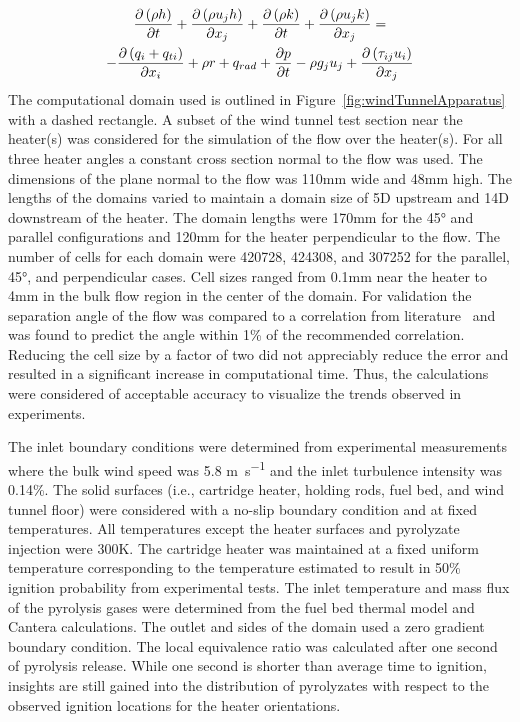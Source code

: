             \begin{multline}
                \pder[\left(\rho h \right)]{t} + \pder[\left( \rho u_j h \right)]{x_j} + \pder[\left(  \rho k \right)]{t} + \pder[\left( \rho u_j k\right)]{x_j} = \\ -
                \pder[\left( q_i + q_{ti} \right)]{x_i} + \rho r + q_{rad} + \pder[p]{t} - \rho g_j u_j + \pder[\left( \tau_{ij} u_i \right)]{x_j}
            \end{multline}
      The computational domain used is outlined in Figure~\ref{fig:windTunnelApparatus} with a dashed rectangle. A subset of the wind tunnel test section near the heater(s) was considered for the simulation of the flow over the heater(s). For all three heater angles a constant cross section normal to the flow was used. The dimensions of the plane normal to the flow was 110\si{\milli\meter} wide and 48\si{\milli\meter} high. The lengths of the domains varied to maintain a domain size of 5D upstream and 14D downstream of the heater. The domain lengths were 170\si{\milli\meter} for the 45\si{\degree} and parallel configurations and 120\si{\milli\meter} for the heater perpendicular to the flow. The number of cells for each domain were 420728, 424308, and 307252 for the parallel, 45\si{\degree}, and perpendicular cases. Cell sizes ranged from 0.1\si{\milli\meter} near the heater to 4\si{\milli\meter} in the bulk flow region in the center of the domain. For validation the separation angle of the flow was compared to a correlation from literature~\cite{Jiang2020SeparationRegime} and was found to predict the angle within 1\% of the recommended correlation. Reducing the cell size by a factor of two did not appreciably reduce the error and resulted in a significant increase in computational time. Thus, the calculations were considered of acceptable accuracy to visualize the trends observed in experiments.
      
      The inlet boundary conditions were determined from experimental measurements where the bulk wind speed was 5.8 \si{\meter\per\second} and the inlet turbulence intensity was 0.14\%. The solid surfaces (i.e., cartridge heater, holding rods, fuel bed, and wind tunnel floor) were considered with a no-slip boundary condition and at fixed temperatures. All temperatures except the heater surfaces and pyrolyzate injection were 300\si{\kelvin}. The cartridge heater was maintained at a fixed uniform temperature corresponding to the temperature estimated to result in 50\% ignition probability from experimental tests. The inlet temperature and mass flux of the pyrolysis gases were determined from the fuel bed thermal model and Cantera calculations.  The outlet and sides of the domain used a zero gradient boundary condition. The local equivalence ratio was calculated after one second of pyrolysis release. While one second is shorter than average time to ignition, insights are still gained into the distribution of pyrolyzates with respect to the observed ignition locations for the heater orientations. 
    
